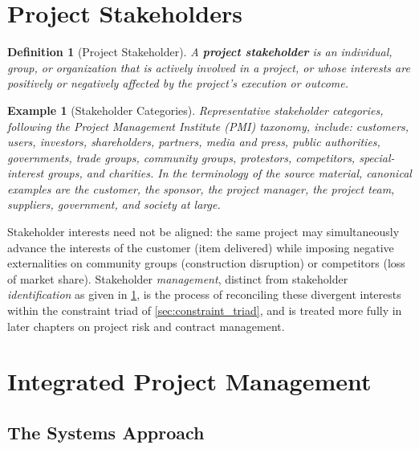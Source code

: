 \documentclass[12pt, a4paper]{report}
\theoremstyle{engnotes}
\newtheorem{defn}{Definition}[section]
\newtheorem{example}{Example}[section]
\begin{document}
\section{Project Stakeholders}
\label{sec:project_stakeholders}

\begin{defn}[Project Stakeholder]\label{def:project_stakeholder}
    A \textbf{project stakeholder} is an individual, group, or organization that is actively involved in a project, or whose interests are positively or negatively affected by the project's execution or outcome.
\end{defn}

\begin{example}[Stakeholder Categories]\label{ex:stakeholder_categories}
    Representative stakeholder categories, following the Project Management Institute (PMI) taxonomy, include: customers, users, investors, shareholders, partners, media and press, public authorities, governments, trade groups, community groups, protestors, competitors, special-interest groups, and charities. In the terminology of the source material, canonical examples are the customer, the sponsor, the project manager, the project team, suppliers, government, and society at large.
\end{example}

\begin{note}
    Stakeholder interests need not be aligned: the same project may simultaneously advance the interests of the customer (item delivered) while imposing negative externalities on community groups (construction disruption) or competitors (loss of market share). Stakeholder \emph{management}, distinct from stakeholder \emph{identification} as given in \cref{def:project_stakeholder}, is the process of reconciling these divergent interests within the constraint triad of \cref{sec:constraint_triad}, and is treated more fully in later chapters on project risk and contract management.
\end{note}

\section{Integrated Project Management}
\label{sec:integrated_project_management}

\subsection{The Systems Approach}
\label{subsec:systems_approach}
\end{document}
